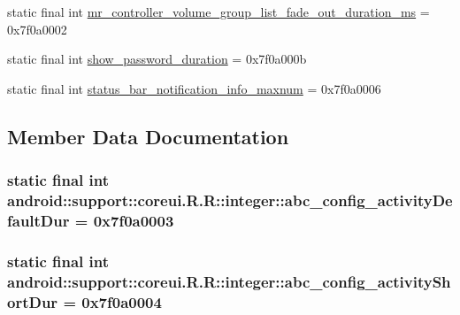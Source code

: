 \begin{CompactItemize}
\item 
static final int \hyperlink{classandroid_1_1support_1_1coreui_1_1_r_1_1integer_ac5b13309323564655b5e97462f90199}{mr\_\-controller\_\-volume\_\-group\_\-list\_\-fade\_\-out\_\-duration\_\-ms} = 0x7f0a0002
\item 
static final int \hyperlink{classandroid_1_1support_1_1coreui_1_1_r_1_1integer_3fe1e0436615ea76758dde9e4824639f}{show\_\-password\_\-duration} = 0x7f0a000b
\item 
static final int \hyperlink{classandroid_1_1support_1_1coreui_1_1_r_1_1integer_db95487e777a00c11ed4d72d010487a7}{status\_\-bar\_\-notification\_\-info\_\-maxnum} = 0x7f0a0006
\end{CompactItemize}


\subsection{Member Data Documentation}
\hypertarget{classandroid_1_1support_1_1coreui_1_1_r_1_1integer_59ca4c1264f906907cd02a5f4d4d13b5}{
\subsubsection[{abc\_\-config\_\-activityDefaultDur}]{\setlength{\rightskip}{0pt plus 5cm}static final int android::support::coreui.R.R::integer::abc\_\-config\_\-activityDefaultDur = 0x7f0a0003}}
\label{classandroid_1_1support_1_1coreui_1_1_r_1_1integer_59ca4c1264f906907cd02a5f4d4d13b5}


\hypertarget{classandroid_1_1support_1_1coreui_1_1_r_1_1integer_037e463a6cf6e5259aff87b9f18ffe86}{
\subsubsection[{abc\_\-config\_\-activityShortDur}]{\setlength{\rightskip}{0pt plus 5cm}static final int android::support::coreui.R.R::integer::abc\_\-config\_\-activityShortDur = 0x7f0a0004}}
\label{classandroid_1_1support_1_1coreui_1_1_r_1_1integer_037e463a6cf6e5259aff87b9f18ffe86}


